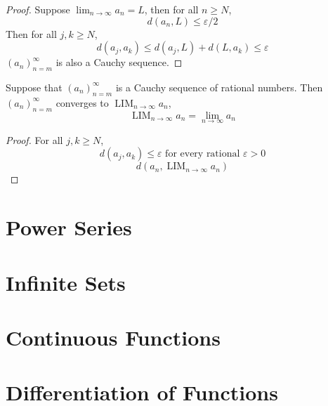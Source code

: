 \documentclass{blog}
\DeclareMathOperator{\LIM}{LIM}
\begin{document}
\begin{proof}
  Suppose $\lim_{n \to \infty} a_{n} = L$, then
  for all $n \geq N$,
  \begin{equation*}
    d(a_{n}, L) \leq \varepsilon / 2
  \end{equation*}
  Then for all $j, k \geq N$,
  \begin{equation*}
    d(a_{j}, a_{k}) \leq d(a_{j}, L) + d(L, a_{k}) \leq \varepsilon
  \end{equation*}
  $(a_{n})_{n = m}^{\infty}$ is also a Cauchy sequence.
\end{proof}

\begin{proposition}[LIM = lim]
  Suppose that $(a_{n})_{n = m}^{\infty}$ is a Cauchy sequence of rational numbers.
  Then $(a_{n})_{n = m}^{\infty}$ converges to $\LIM_{n \to \infty} a_{n}$,
  \begin{equation*}
    \LIM_{n \to \infty} a_{n} = \lim_{n \to \infty} a_{n}
  \end{equation*}
\end{proposition}

\begin{proof}
  For all $j, k \geq N$,
  \begin{equation*}
    d(a_{j}, a_{k}) \leq \varepsilon \text{ for every rational } \varepsilon > 0
  \end{equation*}
  \begin{equation*}
    d(a_{n}, \LIM_{n \to \infty} a_{n})
  \end{equation*}
\end{proof}

\section{Power Series}

\section{Infinite Sets}

\section{Continuous Functions}

\section{Differentiation of Functions}
\end{document}
